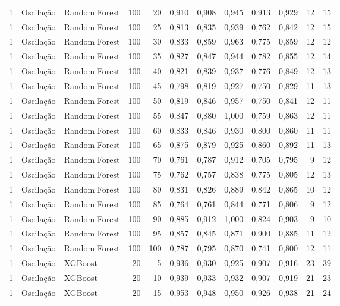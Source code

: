 \begin{longtable}{@{}rllrrrrrrrrr@{}}
1 & Oscilação & Random Forest & 100 & 20 & 0,910 & 0,908 & 0,945 & 0,913 & 0,929 & 12 & 15 \\
1 & Oscilação & Random Forest & 100 & 25 & 0,813 & 0,835 & 0,939 & 0,762 & 0,842 & 12 & 15 \\
1 & Oscilação & Random Forest & 100 & 30 & 0,833 & 0,859 & 0,963 & 0,775 & 0,859 & 12 & 12 \\
1 & Oscilação & Random Forest & 100 & 35 & 0,827 & 0,847 & 0,944 & 0,782 & 0,855 & 12 & 14 \\
1 & Oscilação & Random Forest & 100 & 40 & 0,821 & 0,839 & 0,937 & 0,776 & 0,849 & 12 & 13 \\
1 & Oscilação & Random Forest & 100 & 45 & 0,798 & 0,819 & 0,927 & 0,750 & 0,829 & 11 & 13 \\
1 & Oscilação & Random Forest & 100 & 50 & 0,819 & 0,846 & 0,957 & 0,750 & 0,841 & 12 & 11 \\
1 & Oscilação & Random Forest & 100 & 55 & 0,847 & 0,880 & 1,000 & 0,759 & 0,863 & 12 & 11 \\
1 & Oscilação & Random Forest & 100 & 60 & 0,833 & 0,846 & 0,930 & 0,800 & 0,860 & 11 & 11 \\
1 & Oscilação & Random Forest & 100 & 65 & 0,875 & 0,879 & 0,925 & 0,860 & 0,892 & 11 & 13 \\
1 & Oscilação & Random Forest & 100 & 70 & 0,761 & 0,787 & 0,912 & 0,705 & 0,795 & 9 & 12 \\
1 & Oscilação & Random Forest & 100 & 75 & 0,762 & 0,757 & 0,838 & 0,775 & 0,805 & 12 & 13 \\
1 & Oscilação & Random Forest & 100 & 80 & 0,831 & 0,826 & 0,889 & 0,842 & 0,865 & 10 & 12 \\
1 & Oscilação & Random Forest & 100 & 85 & 0,764 & 0,761 & 0,844 & 0,771 & 0,806 & 9 & 12 \\
1 & Oscilação & Random Forest & 100 & 90 & 0,885 & 0,912 & 1,000 & 0,824 & 0,903 & 9 & 10 \\
1 & Oscilação & Random Forest & 100 & 95 & 0,857 & 0,845 & 0,871 & 0,900 & 0,885 & 11 & 12 \\
1 & Oscilação & Random Forest & 100 & 100 & 0,787 & 0,795 & 0,870 & 0,741 & 0,800 & 12 & 11 \\
1 & Oscilação & XGBoost & 20 & 5 & 0,936 & 0,930 & 0,925 & 0,907 & 0,916 & 23 & 39 \\
1 & Oscilação & XGBoost & 20 & 10 & 0,939 & 0,933 & 0,932 & 0,907 & 0,919 & 21 & 23 \\
1 & Oscilação & XGBoost & 20 & 15 & 0,953 & 0,948 & 0,950 & 0,926 & 0,938 & 21 & 24 \\

\end{longtable}
